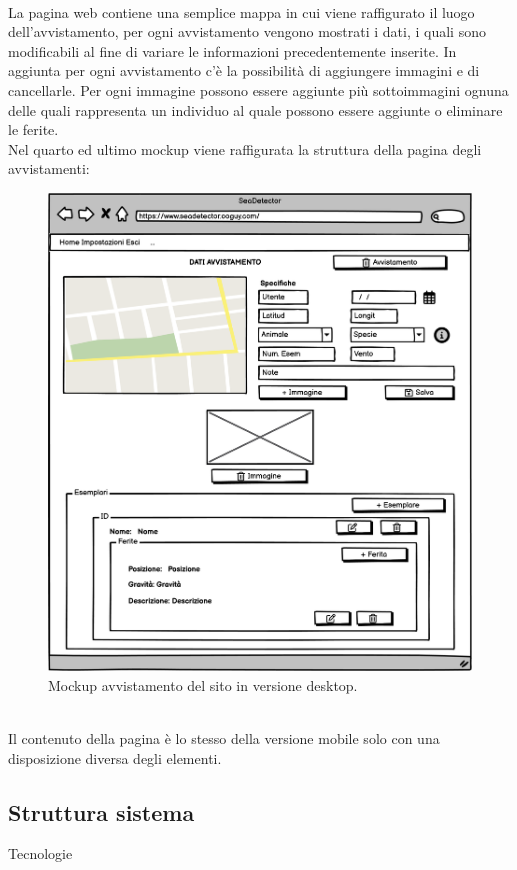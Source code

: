 \documentclass[a4paper,final,12pt]{report}
\begin{document}
\\La pagina web contiene una semplice mappa in cui viene raffigurato il luogo dell'avvistamento, per ogni avvistamento vengono mostrati i dati, i quali sono modificabili al fine di variare le informazioni precedentemente inserite. In aggiunta per ogni avvistamento c'è la possibilità di aggiungere immagini e di cancellarle. Per ogni immagine possono essere aggiunte più sottoimmagini ognuna delle quali rappresenta un individuo al quale possono essere aggiunte o eliminare le ferite.\\
Nel quarto ed ultimo mockup viene raffigurata la struttura della pagina degli avvistamenti:
\begin{figure}[hbtp]
\centering
\includegraphics[scale=0.47]{img_concettuale/avvistamentoDesk.png}
\caption{Mockup avvistamento del sito in versione desktop.}
\end{figure}
\\Il contenuto della pagina è lo stesso della versione mobile solo con una disposizione diversa degli elementi.


\subsection{Struttura sistema}
Tecnologie
\end{document}
